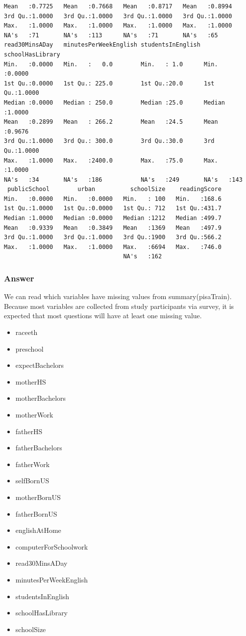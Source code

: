 \documentclass[letterpaper, 9pt, onecolumn, twoside, technote, final]{IEEEtran}
\begin{document}
\begin{verbatim}
Mean   :0.7725   Mean   :0.7668   Mean   :0.8717   Mean   :0.8994
3rd Qu.:1.0000   3rd Qu.:1.0000   3rd Qu.:1.0000   3rd Qu.:1.0000
Max.   :1.0000   Max.   :1.0000   Max.   :1.0000   Max.   :1.0000
NA's   :71       NA's   :113      NA's   :71       NA's   :65
read30MinsADay   minutesPerWeekEnglish studentsInEnglish schoolHasLibrary
Min.   :0.0000   Min.   :   0.0        Min.   : 1.0      Min.   :0.0000
1st Qu.:0.0000   1st Qu.: 225.0        1st Qu.:20.0      1st Qu.:1.0000
Median :0.0000   Median : 250.0        Median :25.0      Median :1.0000
Mean   :0.2899   Mean   : 266.2        Mean   :24.5      Mean   :0.9676
3rd Qu.:1.0000   3rd Qu.: 300.0        3rd Qu.:30.0      3rd Qu.:1.0000
Max.   :1.0000   Max.   :2400.0        Max.   :75.0      Max.   :1.0000
NA's   :34       NA's   :186           NA's   :249       NA's   :143
 publicSchool        urban          schoolSize    readingScore
Min.   :0.0000   Min.   :0.0000   Min.   : 100   Min.   :168.6
1st Qu.:1.0000   1st Qu.:0.0000   1st Qu.: 712   1st Qu.:431.7
Median :1.0000   Median :0.0000   Median :1212   Median :499.7
Mean   :0.9339   Mean   :0.3849   Mean   :1369   Mean   :497.9
3rd Qu.:1.0000   3rd Qu.:1.0000   3rd Qu.:1900   3rd Qu.:566.2
Max.   :1.0000   Max.   :1.0000   Max.   :6694   Max.   :746.0
                                  NA's   :162
\end{verbatim}

\subsubsection{Answer}
\label{sec-2-3-1}

We can read which variables have missing values from
summary(pisaTrain). Because most variables are collected from study
participants via survey, it is expected that most questions will have
at least one missing value.

\begin{itemize}
\item raceeth
\item preschool
\item expectBachelors
\item motherHS
\item motherBachelors
\item motherWork
\item fatherHS
\item fatherBachelors
\item fatherWork
\item selfBornUS
\item motherBornUS
\item fatherBornUS
\item englishAtHome
\item computerForSchoolwork
\item read30MinsADay
\item minutesPerWeekEnglish
\item studentsInEnglish
\item schoolHasLibrary
\item schoolSize
\end{itemize}
\end{document}
